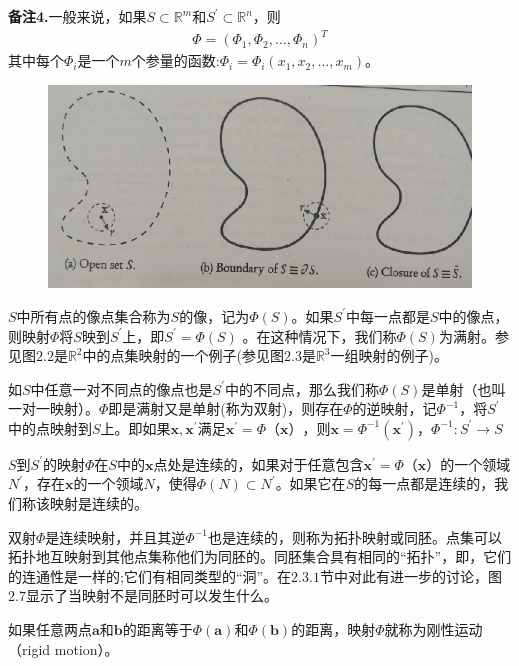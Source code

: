 \documentclass[12pt,a4paper]{article}
\numberwithin{equation}{section}
\begin{document}
\textbf{备注4.}一般来说，如果$S\subset \mathbb{R}^m$和$S^{'}\subset \mathbb{R}^n$，则
\begin{gather}
\Phi =(\Phi _1,\Phi _2,...,\Phi_n)^T
\end{gather}
其中每个$\Phi _i$是一个$m$个参量的函数:$\Phi _i = \Phi _i(x_1,x_2,...,x_m)$。
\begin{figure}[H]
\centering
\includegraphics[scale=0.5]{./figures/21.png}
\caption{}
\end{figure}
$S$中所有点的像点集合称为$S$的像，记为$\Phi (S)$。如果$S^{'}$中每一点都是$S$中的像点，则映射$\Phi$将$S$映到$S^{'}$上，即$S^{'}=\Phi (S)$
。在这种情况下，我们称$\Phi (S)$为满射。参见图$2.2$是$\mathbb{R}^2$中的点集映射的一个例子(参见图$2.3$是$\mathbb{R}^3$一组映射的例子)。

如$S$中任意一对不同点的像点也是$S^{'}$中的不同点，那么我们称$\Phi (S)$是单射（也叫一对一映射）。$\Phi$即是满射又是单射(称为双射)，则存在$\Phi$的逆映射，记$\Phi ^{-1}$，将$S^{'}$中的点映射到$S$上。即如果$\mathbf{x},\mathbf{x}^{'}$满足$\mathbf{x}^{'}= \Phi （\mathbf{x} ）$，则$\mathbf{x}=\Phi ^{-1} (\mathbf{x}^{'})$，$\Phi ^{-1} :S^{'}\rightarrow S$

$S$到$S^{'}$的映射$\Phi$在$S$中的$\mathbf{x}$点处是连续的，如果对于任意包含$\mathbf{x}^{'}= \Phi （\mathbf{x}）$的一个领域$N^{'}$，存在$\mathbf{x}$的一个领域$N$，使得$\Phi (N)\subset N^{'}$。如果它在$S$的每一点都是连续的，我们称该映射是连续的。

双射$\Phi$是连续映射，并且其逆$\Phi^{-1}$也是连续的，则称为拓扑映射或同胚。点集可以拓扑地互映射到其他点集称他们为同胚的。同胚集合具有相同的“拓扑”，即，它们的连通性是一样的;它们有相同类型的“洞”。在$2.3.1$节中对此有进一步的讨论，图$2.7$显示了当映射不是同胚时可以发生什么。

如果任意两点$\mathbf{a}$和$\mathbf{b}$的距离等于$\Phi(\mathbf{a})$和$\Phi(\mathbf{b})$的距离，映射$\Phi$就称为刚性运动（rigid motion）。
\end{document}
